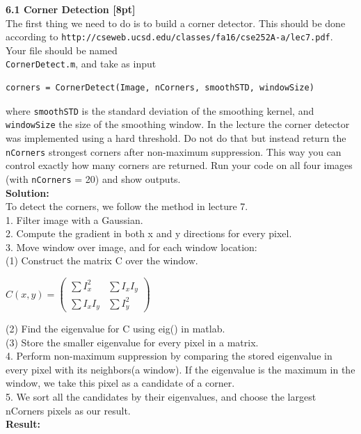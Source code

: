 \documentclass{assignment}
\begin{document}
\begin{problemlist}
\textbf{6.1 Corner Detection [8pt]}\\
The first thing we need to do is to build a corner detector. This should be done according to \texttt{http://cseweb.ucsd.edu/classes/fa16/cse252A-a/lec7.pdf}. Your file should be named\\
\texttt{CornerDetect.m}, and take as input\\
\begin{lstlisting}
corners = CornerDetect(Image, nCorners, smoothSTD, windowSize)
\end{lstlisting}
where \texttt{smoothSTD} is the standard deviation of the smoothing kernel, and \texttt{windowSize} the size of the smoothing window. In the lecture the corner detector was implemented using a hard threshold. Do not do that but instead return the \texttt{nCorners} strongest corners after non-maximum suppression. This way you can control exactly how many corners are returned. Run your code on all four images (with \texttt{nCorners} = 20) and show outputs.\\
\textbf{Solution:}\\
To detect the corners, we follow the method in lecture 7.\\
1. Filter image with a Gaussian.\\
2. Compute the gradient in both x and y directions for every pixel.\\
3. Move window over image, and for each window location: \\
(1) Construct the matrix C over the window.\\
\begin{center}
$
C(x, y) =
\left(
\begin{array}{clr}
\sum{}I_x^2 & \sum{}I_xI_y\\
\sum{}I_xI_y & \sum{}I_y^2
\end{array}
\right)
$
\end{center}
(2) Find the eigenvalue for C using eig() in matlab.\\
(3) Store the smaller eigenvalue for every pixel in a matrix.\\
4. Perform non-maximum suppression by comparing the stored eigenvalue in every pixel with its neighbors(a window). If the eigenvalue is the maximum in the window, we take this pixel as a candidate of a corner.\\
5. We sort all the candidates by their eigenvalues, and choose the largest nCorners pixels as our result.\\
\newpage
\textbf{Result:}


\end{problemlist}
\end{document}
